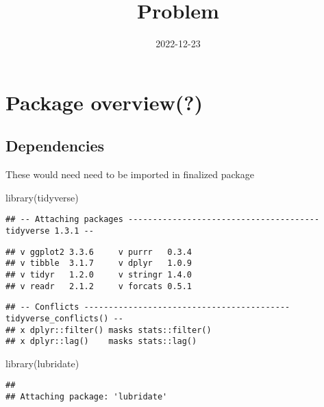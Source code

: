 \documentclass[
]{article}
\title{Problem}
\author{}
\date{\vspace{-2.5em}2022-12-23}
\newenvironment{Shaded}{\begin{snugshade}}{\end{snugshade}}
\newcommand{\FunctionTok}[1]{\textcolor[rgb]{0.00,0.00,0.00}{#1}}
\newcommand{\NormalTok}[1]{#1}
\begin{document}
\maketitle

{
\setcounter{tocdepth}{2}
\tableofcontents
}
\hypertarget{package-overview}{%
\section{Package overview(?)}\label{package-overview}}

\hypertarget{dependencies}{%
\subsection{Dependencies}\label{dependencies}}

These would need need to be imported in finalized package

\begin{Shaded}
\begin{Highlighting}[]
\FunctionTok{library}\NormalTok{(tidyverse)}
\end{Highlighting}
\end{Shaded}

\begin{verbatim}
## -- Attaching packages --------------------------------------- tidyverse 1.3.1 --
\end{verbatim}

\begin{verbatim}
## v ggplot2 3.3.6     v purrr   0.3.4
## v tibble  3.1.7     v dplyr   1.0.9
## v tidyr   1.2.0     v stringr 1.4.0
## v readr   2.1.2     v forcats 0.5.1
\end{verbatim}

\begin{verbatim}
## -- Conflicts ------------------------------------------ tidyverse_conflicts() --
## x dplyr::filter() masks stats::filter()
## x dplyr::lag()    masks stats::lag()
\end{verbatim}

\begin{Shaded}
\begin{Highlighting}[]
\FunctionTok{library}\NormalTok{(lubridate)}
\end{Highlighting}
\end{Shaded}

\begin{verbatim}
## 
## Attaching package: 'lubridate'
\end{verbatim}
\end{document}
